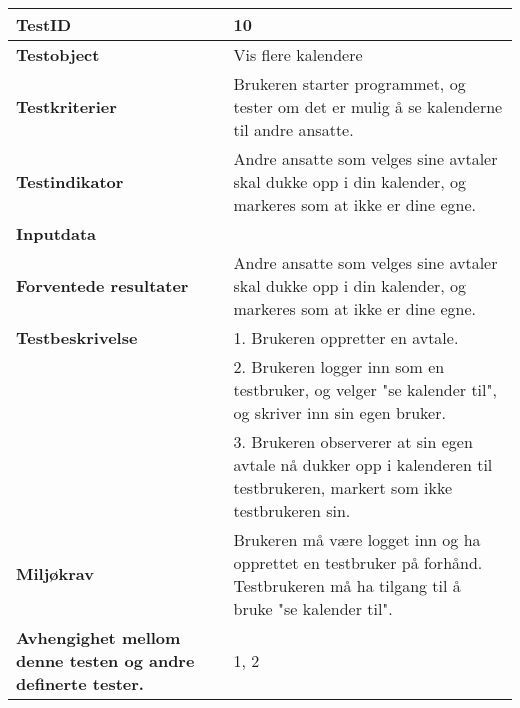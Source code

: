 \mbox{}\\

	\begin{tabularx}{1.2\textwidth}{| p{5cm} | X |}
	\hline
	\textbf{TestID} 																& 10																	\\ \hline
	\textbf{Testobject} 															& Vis flere kalendere															\\ \hline
	\textbf{Testkriterier} 															& Brukeren starter programmet, og tester om det er mulig å se kalenderne til andre ansatte.						\\ \hline
	\textbf{Testindikator} 															& Andre ansatte som velges sine avtaler skal dukke opp i din kalender, og markeres som at ikke er dine egne.													\\ \hline
	\textbf{Inputdata} 															& 														\\  \hline
	\textbf{Forventede resultater}									 				& Andre ansatte som velges sine avtaler skal dukke opp i din kalender, og markeres som at ikke er dine egne.				\\ \hline
	\textbf{Testbeskrivelse} 														& 1. Brukeren oppretter en avtale. \\
																			& 2. Brukeren logger inn som en testbruker, og velger "se kalender til", og skriver inn sin egen bruker.\\
																			& 3. Brukeren observerer at sin egen avtale nå dukker opp i kalenderen til testbrukeren, markert som ikke testbrukeren sin.					\\ \hline
	\textbf{Miljøkrav}			 												& Brukeren må være logget inn og ha opprettet en testbruker på forhånd. Testbrukeren må ha tilgang til å bruke "se kalender til".						\\ \hline
	\textbf{Avhengighet mellom denne testen og andre definerte tester.}		 				& 1, 2 				 													\\ \hline
	\end{tabularx}

\mbox{}\\

